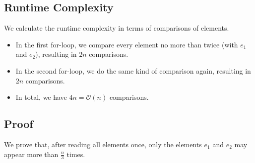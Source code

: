 \documentclass[12pt]{article}
\begin{document}
\subsection*{Runtime Complexity}
We calculate the runtime complexity in terms of comparisons of elements.
\begin{itemize}
	\item In the first for-loop, we compare every element no more than twice (with $e_1$ and $e_2$), resulting in $2n$ comparisons.
	\item In the second for-loop, we do the same kind of comparison again, resulting in $2n$ comparisons.
	\item In total, we have $4n = \mathcal{O}(n)$ comparisons.
\end{itemize}

\subsection*{Proof}
We prove that, after reading all elements once, only the elements $e_1$ and $e_2$ may appear more than $\frac{n}{3}$ times.
\end{document}
